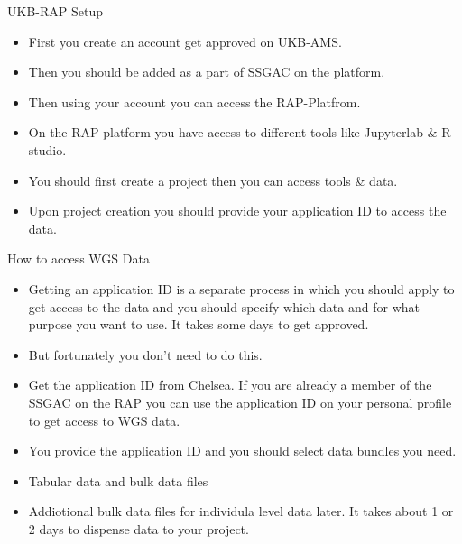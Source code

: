 \documentclass{beamer}
\begin{document}
\begin{frame}{UKB-RAP Setup}

      \begin{itemize}
            \item First you create an account get approved on UKB-AMS.
            \item Then you should be added as a part of SSGAC on the platform.
            \item Then using your account you can access the RAP-Platfrom.
            \item On the RAP platform you have access to different tools
            like Jupyterlab \& R studio. 
            \item You should first create a project then you can access tools \& data.
            \item Upon project creation you should provide your application ID to access the data.
      \end{itemize}

      
\end{frame}


\begin{frame}{How to access WGS Data}

      \begin{itemize}
            \item Getting an application ID is a separate process in which you
            should apply to get access to the data and you should specify which
            data and for what purpose you want to use. It takes some days to get
            approved.
            \item But fortunately you don't need to do this.
            \item Get the application ID from Chelsea. If you are already 
            a member of the SSGAC on the RAP you can use the application ID on your
            personal profile to get access to WGS data.
            \item You provide the application ID and you should select data bundles you need.
            \item Tabular data and bulk data files
            \item Addiotional bulk data files for individula level data later. It takes about 1 or 2 days to dispense data to your project.
      \end{itemize}

\end{frame}
\end{document}
